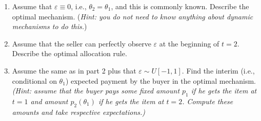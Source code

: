 \documentclass[a4paper]{article}
\newif\ifsolutions
\begin{document}
	\begin{enumerate}
		\item %
		Assume that $\varepsilon \equiv 0$, i.e., $\theta_2 = \theta_1$, and this is commonly known. Describe the optimal mechanism. (\emph{Hint: you do not need to know anything about dynamic mechanisms to do this.})
		\item %
		Assume that the seller can perfectly observe $\varepsilon$ at the beginning of $t=2$. Describe the optimal allocation rule.
		\item %
		Assume the same as in part 2 plus that $\varepsilon \sim U[-1,1]$. Find the interim (i.e., conditional on $\theta_1$) expected payment by the buyer in the optimal mechanism.
		\emph{(Hint: assume that the buyer pays some fixed amount $p_1$ if he gets the item at $t=1$ and amount $p_2(\theta_1)$ if he gets the item at $t=2$. Compute these amounts and take respective expectations.)}
	\end{enumerate}


\ifsolutions
\end{document}
